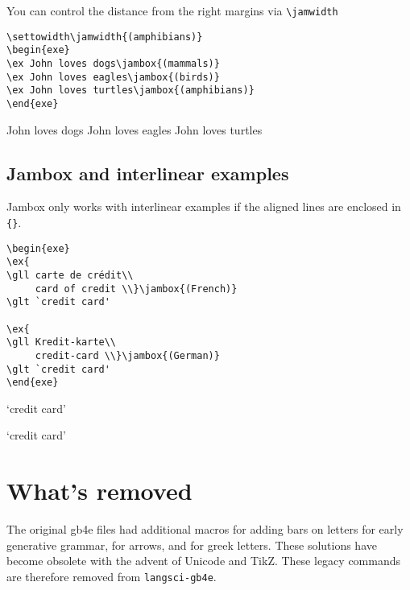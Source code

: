 \documentclass[output=paper]{langscibook}
\newcommand{\cmd}[1]{\texttt{\textbackslash#1}}
\begin{document}
You can control the distance from the right margins via \cmd{jamwidth}

\begin{lstlisting}
\settowidth\jamwidth{(amphibians)}
\begin{exe}
\ex John loves dogs\jambox{(mammals)}
\ex John loves eagles\jambox{(birds)}
\ex John loves turtles\jambox{(amphibians)}   
\end{exe}
 \end{lstlisting}
 
\begin{exe}
\settowidth{}
\ex John loves dogs
\ex John loves eagles
\ex John loves turtles   
\end{exe}  


\subsection{Jambox and interlinear examples} 
Jambox only works with interlinear examples if the aligned lines are enclosed in \texttt{\{\}}. 

\begin{lstlisting}
\begin{exe} 
\ex{
\gll carte de crédit\\
     card of credit \\}\jambox{(French)}
\glt `credit card'

\ex{
\gll Kredit-karte\\
     credit-card \\}\jambox{(German)}
\glt `credit card'
\end{exe} 
 \end{lstlisting}
 
\begin{exe} 
\glt `credit card'

\glt `credit card'
\end{exe} 




\section{What's removed}
The original gb4e files had additional macros for adding bars on letters for early generative grammar, for arrows, and for greek letters. These solutions have become obsolete with the advent of Unicode and TikZ. These legacy commands are therefore removed from \texttt{langsci-gb4e}.
\end{document}
